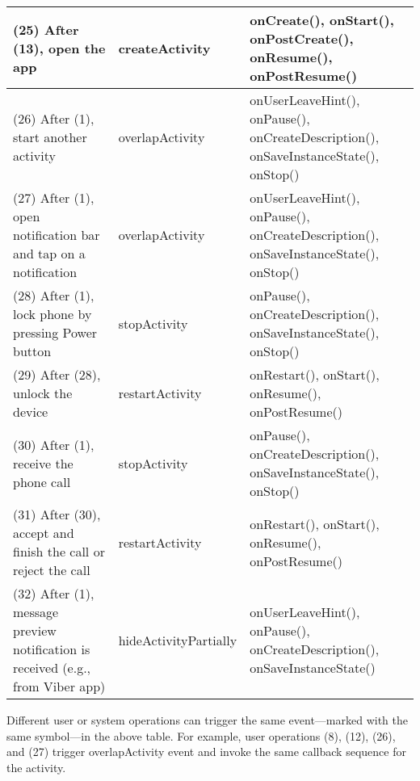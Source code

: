 \documentclass[10pt]{elsarticle}
\begin{document}
\begin{ThreePartTable}
\begin{scriptsize}
\begin{longtable}{P{3.2cm} P{1.5cm} P{5.9cm}}
(25) After (13), open the app & createActivity & {\ttfamily onCreate()}, {\ttfamily onStart()}, {\ttfamily onPostCreate()}, {\ttfamily onResume()}, {\ttfamily onPostResume()}\\ \hline
(26) After (1), start another activity & overlapActivity & {\ttfamily onUserLeaveHint()}, {\ttfamily onPause()}, {\ttfamily onCreateDescription()}, {\ttfamily onSaveInstanceState()}, {\ttfamily onStop()}\\ \hline
(27) After (1), open notification bar and tap on a notification & overlapActivity & {\ttfamily onUserLeaveHint()}, {\ttfamily onPause()}, {\ttfamily onCreateDescription()}, {\ttfamily onSaveInstanceState()}, {\ttfamily onStop()} \\ \hline
(28) After (1), lock phone by pressing Power button & stopActivity & {\ttfamily onPause()}, {\ttfamily onCreateDescription()}, {\ttfamily onSaveInstanceState()}, {\ttfamily onStop()}\\ \hline
(29) After (28), unlock the device & restartActivity & {\ttfamily onRestart()}, {\ttfamily onStart()}, {\ttfamily onResume()}, {\ttfamily onPostResume()}\\ \hline
(30) After (1), receive the phone call & stopActivity & {\ttfamily onPause()}, {\ttfamily onCreateDescription()}, {\ttfamily onSaveInstanceState()}, {\ttfamily onStop()}\\ \hline
(31) After (30), accept and finish the call or reject the call & restartActivity & {\ttfamily onRestart()}, {\ttfamily onStart()}, {\ttfamily onResume()}, {\ttfamily onPostResume()}\\ \hline
(32) After (1), message preview notification is received (e.g., from Viber \cite{viber} app) & hideActivityPartially & {\ttfamily onUserLeaveHint()}, {\ttfamily onPause()}, {\ttfamily onCreateDescription()}, {\ttfamily onSaveInstanceState()} 
\end{longtable}
  \begin{tablenotes}
    \item[]{Different user or system operations can trigger the same event---marked with the same symbol---in the above table. For example, user operations (8), (12), (26), and (27) trigger overlapActivity event and invoke the same callback sequence for the activity.}
    \end{tablenotes}
\end{scriptsize}    
\end{ThreePartTable}



\newcommand*\mycircle{\textcircled{\textbullet}}
\end{document}
